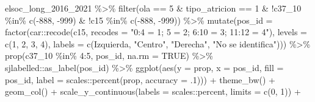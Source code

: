 \documentclass[
  12pt,
]{book}
\newenvironment{Shaded}{\begin{snugshade}}{\end{snugshade}}
\newcommand{\AttributeTok}[1]{\textcolor[rgb]{0.77,0.63,0.00}{#1}}
\newcommand{\ConstantTok}[1]{\textcolor[rgb]{0.00,0.00,0.00}{#1}}
\newcommand{\DecValTok}[1]{\textcolor[rgb]{0.00,0.00,0.81}{#1}}
\newcommand{\FunctionTok}[1]{\textcolor[rgb]{0.00,0.00,0.00}{#1}}
\newcommand{\NormalTok}[1]{#1}
\newcommand{\SpecialCharTok}[1]{\textcolor[rgb]{0.00,0.00,0.00}{#1}}
\newcommand{\StringTok}[1]{\textcolor[rgb]{0.31,0.60,0.02}{#1}}
\begin{document}
\begin{Shaded}
\begin{Highlighting}[]
\NormalTok{elsoc\_long\_2016\_2021 }\SpecialCharTok{\%\textgreater{}\%} 
  \FunctionTok{filter}\NormalTok{(ola }\SpecialCharTok{==} \DecValTok{5} \SpecialCharTok{\&}\NormalTok{ tipo\_atricion }\SpecialCharTok{==} \DecValTok{1} \SpecialCharTok{\&} 
           \SpecialCharTok{!}\NormalTok{c37\_10 }\SpecialCharTok{\%in\%} \FunctionTok{c}\NormalTok{(}\SpecialCharTok{{-}}\DecValTok{888}\NormalTok{, }\SpecialCharTok{{-}}\DecValTok{999}\NormalTok{) }\SpecialCharTok{\&} \SpecialCharTok{!}\NormalTok{c15 }\SpecialCharTok{\%in\%} \FunctionTok{c}\NormalTok{(}\SpecialCharTok{{-}}\DecValTok{888}\NormalTok{, }\SpecialCharTok{{-}}\DecValTok{999}\NormalTok{)) }\SpecialCharTok{\%\textgreater{}\%} 
    \FunctionTok{mutate}\NormalTok{(}\AttributeTok{pos\_id =} \FunctionTok{factor}\NormalTok{(car}\SpecialCharTok{::}\FunctionTok{recode}\NormalTok{(c15, }\AttributeTok{recodes =} \StringTok{"0:4 = 1; 5 = 2; 6:10 = 3; 11:12 = 4"}\NormalTok{),}
                         \AttributeTok{levels =} \FunctionTok{c}\NormalTok{(}\DecValTok{1}\NormalTok{, }\DecValTok{2}\NormalTok{, }\DecValTok{3}\NormalTok{, }\DecValTok{4}\NormalTok{),}
                         \AttributeTok{labels =} \FunctionTok{c}\NormalTok{(}\StringTok{\textquotesingle{}Izquierda\textquotesingle{}}\NormalTok{, }\StringTok{"Centro"}\NormalTok{, }\StringTok{"Derecha"}\NormalTok{, }\StringTok{"No se identifica"}\NormalTok{))) }\SpecialCharTok{\%\textgreater{}\%}
  \FunctionTok{prop}\NormalTok{(c37\_10 }\SpecialCharTok{\%in\%} \DecValTok{4}\SpecialCharTok{:}\DecValTok{5}\NormalTok{, pos\_id, }\AttributeTok{na.rm =} \ConstantTok{TRUE}\NormalTok{) }\SpecialCharTok{\%\textgreater{}\%} 
\NormalTok{  sjlabelled}\SpecialCharTok{::}\FunctionTok{as\_label}\NormalTok{(pos\_id) }\SpecialCharTok{\%\textgreater{}\%} 
  \FunctionTok{ggplot}\NormalTok{(}\FunctionTok{aes}\NormalTok{(}\AttributeTok{y =}\NormalTok{ prop, }\AttributeTok{x =}\NormalTok{ pos\_id, }\AttributeTok{fill =}\NormalTok{ pos\_id,}
               \AttributeTok{label =}\NormalTok{ scales}\SpecialCharTok{::}\FunctionTok{percent}\NormalTok{(prop, }\AttributeTok{accuracy =}\NormalTok{ .}\DecValTok{1}\NormalTok{))) }\SpecialCharTok{+}
  \FunctionTok{theme\_bw}\NormalTok{() }\SpecialCharTok{+} 
    \FunctionTok{geom\_col}\NormalTok{() }\SpecialCharTok{+}
    \FunctionTok{scale\_y\_continuous}\NormalTok{(}\AttributeTok{labels =}\NormalTok{ scales}\SpecialCharTok{::}\NormalTok{percent,}
                       \AttributeTok{limits =} \FunctionTok{c}\NormalTok{(}\DecValTok{0}\NormalTok{, }\DecValTok{1}\NormalTok{)) }\SpecialCharTok{+}

\end{Highlighting}
\end{Shaded}
\end{document}
